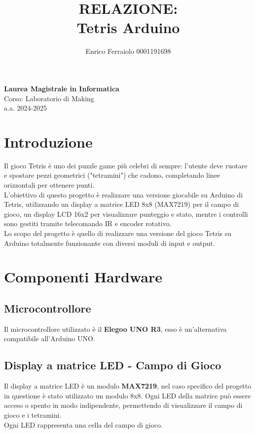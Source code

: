 \documentclass[a4paper, 12pt]{article}
\title{\textbf{RELAZIONE: \\ Tetris Arduino}}
\author{Enrico Ferraiolo 0001191698}
\date{}
\begin{document}
\maketitle

\begin{center}
    \textbf{Laurea Magistrale in Informatica}\\
    \vspace{0.3cm}
    Corso: Laboratorio di Making\\
    a.a. 2024-2025
    \vspace{2cm}
\end{center}

\newpage

\tableofcontents
\newpage

\section{Introduzione}
Il gioco Tetris è uno dei puzzle game più celebri di sempre: l'utente deve ruotare e spostare pezzi geometrici ("tetramini") che cadono, 
completando linee orizzontali per ottenere punti.\\
L'obiettivo di questo progetto è realizzare una versione giocabile su Arduino di Tetris, utilizzando un display a matrice LED 8x8 (MAX7219) 
per il campo di gioco, un display LCD 16x2 per visualizzare punteggio e stato, mentre i controlli sono gestiti tramite telecomando IR e encoder rotativo.\\
Lo scopo del progetto è quello di realizzare una versione del gioco Tetris su Arduino totalmente funzionante con diversi moduli di input e output.\\
\newpage

\section{Componenti Hardware}
\subsection{Microcontrollore}
Il microcontrollore utilizzato è il \textbf{Elegoo UNO R3}, esso è un'alternativa compatibile all'Arduino UNO.

\subsection{Display a matrice LED - Campo di Gioco}
Il display a matrice LED è un modulo \textbf{MAX7219}, nel caso specifico del progetto in questione è stato utilizzato un modulo 8x8.
Ogni LED della matrice può essere acceso o spento in modo indipendente, permettendo di visualizzare il campo di gioco e i tetramini.\\
Ogni LED rappresenta una cella del campo di gioco.
\end{document}
